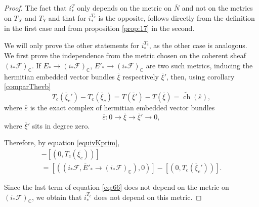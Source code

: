 \documentclass[10pt,twoside]{article}
\numberwithin{equation}{section}
\theoremstyle{plain}
\theoremstyle{definition}
\DeclareMathOperator{\ch}{ch}
\newcommand{\CC}{{\mathbb C}}
\begin{document}
\begin{proof}
  The fact that $i^{T}_{\ast}$ only depends on the metric on
  $\overline N$ and not on the metrics on $T_{X}$ and $T_{Y}$ and that
  for $i^{T_{c}}_{\ast}$ is the opposite, follows directly from the
  definition in the first case and from proposition \ref{prop:17} in
  the second.

We will only prove the other statements for $i^{T_{c}}_{\ast}$, as
the other case is analogous.
We first prove the independence from the metric chosen on the coherent
sheaf
$(i_{\ast}\mathcal{F})_{\CC}$. If $\overline{E}_{\ast}\to
(i_{\ast}\mathcal{F})_{\CC}$, $\overline{E}'_{\ast}\to
(i_{\ast}\mathcal{F})_{\CC}$ are two such metrics, inducing the
hermitian embedded vector bundles $\overline{\xi}$ respectively
$\overline{\xi}'$, then, using corollary \ref{comparThevb}
\begin{displaymath}
T_{c}(\overline{\xi}_{c}')-T_{c}(\overline{\xi}_{c})=
T(\overline{\xi}')-T(\overline{\xi})=
\widetilde{\ch}(\overline{\varepsilon}), 
\end{displaymath}
where $\overline {\varepsilon }$ is the exact complex of hermitian
embedded vector bundles
\begin{displaymath}
\overline{\varepsilon}\colon 
0\longrightarrow\overline{\xi}\longrightarrow
\overline{\xi}'\longrightarrow 0,
\end{displaymath}
where $\overline{\xi}'$ sits in degree zero.

Therefore, by equation \ref{equivKprim},
\begin{multline*}
  [((i_{\ast}\mathcal{F},\overline{E}_{\ast}\to
(i_{\ast}\mathcal{F})_{\CC}) ,0)]-[(0,T_{c}(\overline{\xi_{c}}))]\\=
[((i_{\ast}\mathcal{F},\overline{E}'_{\ast}\to
(i_{\ast}\mathcal{F})_{\CC}) ,0)]-[(0,T_{c}(\overline{\xi}_{c}'))].
\end{multline*}

Since the last term of equation \ref{eq:66} does not depend on the
metric on $(i_{\ast}\mathcal{F})_{\CC}$, we obtain that $i^{T_{c}}_{\ast}$
does not depend on this 
metric.


\end{proof}
\end{document}
